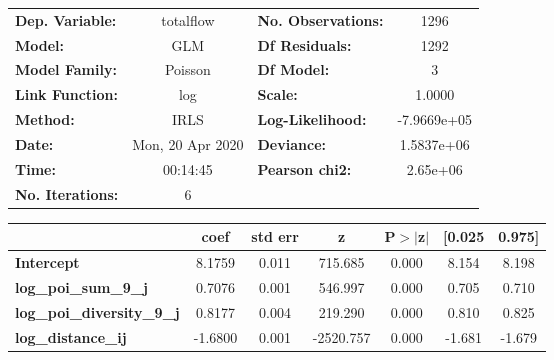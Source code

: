 \begin{center}
\begin{tabular}{lclc}
\toprule
\textbf{Dep. Variable:}            &    totalflow     & \textbf{  No. Observations:  } &      1296    \\
\textbf{Model:}                    &       GLM        & \textbf{  Df Residuals:      } &      1292    \\
\textbf{Model Family:}             &     Poisson      & \textbf{  Df Model:          } &         3    \\
\textbf{Link Function:}            &       log        & \textbf{  Scale:             } &     1.0000   \\
\textbf{Method:}                   &       IRLS       & \textbf{  Log-Likelihood:    } & -7.9669e+05  \\
\textbf{Date:}                     & Mon, 20 Apr 2020 & \textbf{  Deviance:          } &  1.5837e+06  \\
\textbf{Time:}                     &     00:14:45     & \textbf{  Pearson chi2:      } &   2.65e+06   \\
\textbf{No. Iterations:}           &        6         & \textbf{                     } &              \\
\bottomrule
\end{tabular}
\begin{tabular}{lcccccc}
                                   & \textbf{coef} & \textbf{std err} & \textbf{z} & \textbf{P$> |$z$|$} & \textbf{[0.025} & \textbf{0.975]}  \\
\midrule
\textbf{Intercept}                 &       8.1759  &        0.011     &   715.685  &         0.000        &        8.154    &        8.198     \\
\textbf{log\_poi\_sum\_9\_j}       &       0.7076  &        0.001     &   546.997  &         0.000        &        0.705    &        0.710     \\
\textbf{log\_poi\_diversity\_9\_j} &       0.8177  &        0.004     &   219.290  &         0.000        &        0.810    &        0.825     \\
\textbf{log\_distance\_ij}         &      -1.6800  &        0.001     & -2520.757  &         0.000        &       -1.681    &       -1.679     \\
\bottomrule
\end{tabular}
\end{center}